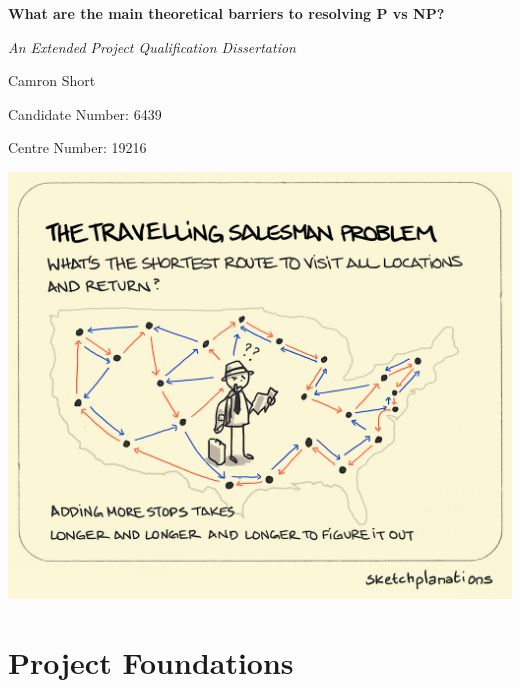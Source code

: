 \documentclass[12pt]{report}
\begin{document}
\begin{titlepage}
    \centering
    \vspace*{1cm}
    {\Huge\bfseries What are the main theoretical barriers to resolving P vs NP?\par}
    \vspace{1.5cm}
    {\Large\itshape An Extended Project Qualification Dissertation\par}
    \vspace{2cm}
    {\Large Camron Short\par}
    {\large Candidate Number: 6439\par}
    {\large Centre Number: 19216\par}
    \vspace{0.7cm}
    \includegraphics[width=1\textwidth]{CoverPhoto.jpg}
    \thispagestyle{empty}
\end{titlepage}

\section*{Project Foundations}
\end{document}
